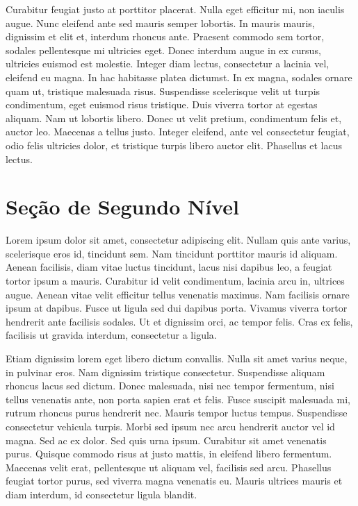 	Curabitur feugiat justo at porttitor placerat. Nulla eget efficitur mi, non iaculis augue. Nunc eleifend ante sed mauris semper lobortis. In mauris mauris, dignissim et elit et, interdum rhoncus ante. Praesent commodo sem tortor, sodales pellentesque mi ultricies eget. Donec interdum augue in ex cursus, ultricies euismod est molestie. Integer diam lectus, consectetur a lacinia vel, eleifend eu magna. In hac habitasse platea dictumst. In ex magna, sodales ornare quam ut, tristique malesuada risus. Suspendisse scelerisque velit ut turpis condimentum, eget euismod risus tristique. Duis viverra tortor at egestas aliquam. Nam ut lobortis libero. Donec ut velit pretium, condimentum felis et, auctor leo. Maecenas a tellus justo. Integer eleifend, ante vel consectetur feugiat, odio felis ultricies dolor, et tristique turpis libero auctor elit. Phasellus et lacus lectus. 
	
	\section{\esp Seção de Segundo Nível}\label{section:1.1}
	
		Lorem ipsum dolor sit amet, consectetur adipiscing elit. Nullam quis ante varius, scelerisque eros id, tincidunt sem. Nam tincidunt porttitor mauris id aliquam. Aenean facilisis, diam vitae luctus tincidunt, lacus nisi dapibus leo, a feugiat tortor ipsum a mauris. Curabitur id velit condimentum, lacinia arcu in, ultrices augue. Aenean vitae velit efficitur tellus venenatis maximus. Nam facilisis ornare ipsum at dapibus. Fusce ut ligula sed dui dapibus porta. Vivamus viverra tortor hendrerit ante facilisis sodales. Ut et dignissim orci, ac tempor felis. Cras ex felis, facilisis ut gravida interdum, consectetur a ligula.

		Etiam dignissim lorem eget libero dictum convallis. Nulla sit amet varius neque, in pulvinar eros. Nam dignissim tristique consectetur. Suspendisse aliquam rhoncus lacus sed dictum. Donec malesuada, nisi nec tempor fermentum, nisi tellus venenatis ante, non porta sapien erat et felis. Fusce suscipit malesuada mi, rutrum rhoncus purus hendrerit nec. Mauris tempor luctus tempus. Suspendisse consectetur vehicula turpis. Morbi sed ipsum nec arcu hendrerit auctor vel id magna. Sed ac ex dolor. Sed quis urna ipsum. Curabitur sit amet venenatis purus. Quisque commodo risus at justo mattis, in eleifend libero fermentum. Maecenas velit erat, pellentesque ut aliquam vel, facilisis sed arcu. Phasellus feugiat tortor purus, sed viverra magna venenatis eu. Mauris ultrices mauris et diam interdum, id consectetur ligula blandit.

